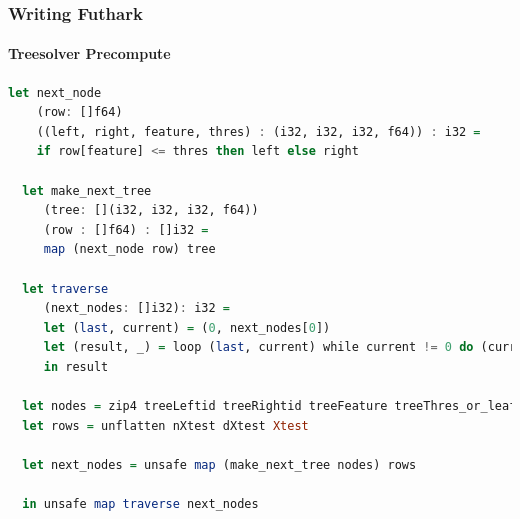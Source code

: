 \documentclass[12pt,t]{beamer}
\begin{document}
\begin{frame}[fragile]
  \frametitle{Writing Futhark}
  \framesubtitle{Treesolver Precompute}
  \begin{minipage}{\textwidth}
  \begin{lstlisting}[basicstyle=\tiny, language=Haskell, breaklines]
  let next_node
    (row: []f64)
    ((left, right, feature, thres) : (i32, i32, i32, f64)) : i32 =
    if row[feature] <= thres then left else right

  let make_next_tree
     (tree: [](i32, i32, i32, f64))
     (row : []f64) : []i32 =
     map (next_node row) tree

  let traverse
     (next_nodes: []i32): i32 =
     let (last, current) = (0, next_nodes[0])
     let (result, _) = loop (last, current) while current != 0 do (current, next_nodes[current])
     in result

  let nodes = zip4 treeLeftid treeRightid treeFeature treeThres_or_leaf
  let rows = unflatten nXtest dXtest Xtest

  let next_nodes = unsafe map (make_next_tree nodes) rows

  in unsafe map traverse next_nodes


\end{lstlisting}
\end{minipage}
\end{frame}
\end{document}
